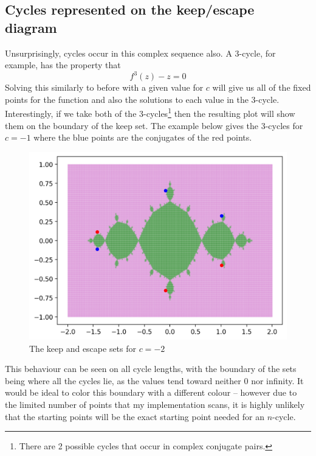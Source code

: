 \documentclass[12pt]{article}
\begin{document}
\subsection{Cycles represented on the keep/escape diagram}
Unsurprisingly, cycles occur in this complex sequence also. A 3-cycle, for example, has the property that
\[f^3(z)-z=0\]
Solving this similarly to before with a given value for $c$ will give us all of the fixed points for the function and also the solutions to each value in the 3-cycle. Interestingly, if we take both of the 3-cycles\footnote{There are 2 possible cycles that occur in complex conjugate pairs.} then the resulting plot will show them on the boundary of the keep set. The example below gives the 3-cycles for $c=-1$ where the blue points are the conjugates of the red points. 
\begin{figure}[H]
	\centering
	\includegraphics[scale=0.8]{zCycles.png}
	\caption{The keep and escape sets for $c=-2$}
\end{figure}
This behaviour can be seen on all cycle lengths, with the boundary of the sets being where all the cycles lie, as the values tend toward neither 0 nor infinity. It would be ideal to color this boundary with a different colour -- however due to the limited number of points that my implementation scans, it is highly unlikely that the starting points will be the exact starting point needed for an $n$-cycle.\\
\end{document}
